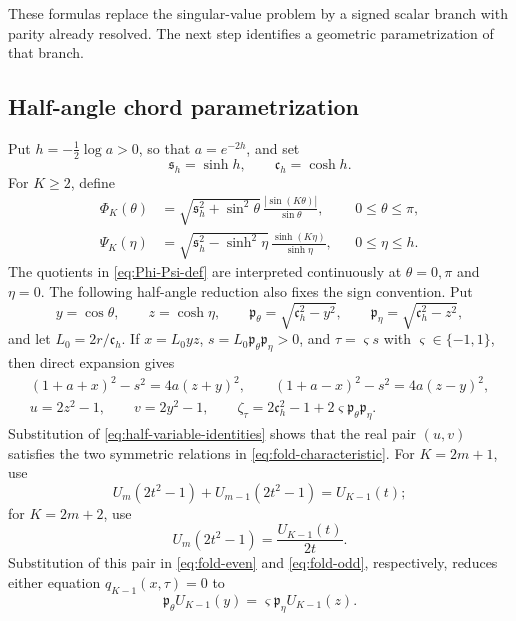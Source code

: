 \documentclass[10pt,twoside]{siamart1116}
\numberwithin{equation}{section}
\begin{document}
These formulas replace the singular-value problem by a signed scalar branch
with parity already resolved.  The next step identifies a geometric
parametrization of that branch.

\subsection{Half-angle chord parametrization}
\label{subsec:half-angle-chords}
Put \(h=-\tfrac12\log a>0\), so that \(a=e^{-2h}\), and set
\[
 \mathfrak s_h=\sinh h,\qquad \mathfrak c_h=\cosh h.
\]
For \(K\geq2\), define
\begin{equation}\label{eq:Phi-Psi-def}
\begin{aligned}
 \Phi_K(\theta)
 &=\sqrt{\mathfrak s_h^2+\sin^2\theta}\,
   \frac{|\sin(K\theta)|}{\sin\theta},
   &&0\leq\theta\leq\pi,\\
 \Psi_K(\eta)
 &=\sqrt{\mathfrak s_h^2-\sinh^2\eta}\,
   \frac{\sinh(K\eta)}{\sinh\eta},
   &&0\leq\eta\leq h.
\end{aligned}
\end{equation}
The quotients in \eqref{eq:Phi-Psi-def} are interpreted continuously at
\(\theta=0,\pi\) and \(\eta=0\).  The following half-angle reduction also
fixes the sign convention.  Put
\[
 y=\cos\theta,\qquad z=\cosh\eta,\qquad
 \mathfrak p_\theta=\sqrt{\mathfrak c_h^2-y^2},\qquad
 \mathfrak p_\eta=\sqrt{\mathfrak c_h^2-z^2},
\]
and let \(L_0=2r/\mathfrak c_h\).  If
\(x=L_0yz\), \(s=L_0\mathfrak p_\theta\mathfrak p_\eta>0\), and
\(\tau=\varsigma s\) with \(\varsigma\in\{-1,1\}\), then direct
expansion gives
\begin{equation}\label{eq:half-variable-identities}
\begin{gathered}
 (1+a+x)^2-s^2=4a(z+y)^2,\qquad
 (1+a-x)^2-s^2=4a(z-y)^2,\\
 u=2z^2-1,\qquad v=2y^2-1,\qquad
 \zeta_\tau=2\mathfrak c_h^2-1
 +2\varsigma\mathfrak p_\theta\mathfrak p_\eta.
\end{gathered}
\end{equation}
Substitution of \eqref{eq:half-variable-identities} shows that the real pair
\((u,v)\) satisfies the two symmetric relations in
\eqref{eq:fold-characteristic}.
For \(K=2m+1\), use
\[
 U_m(2t^2-1)+U_{m-1}(2t^2-1)=U_{K-1}(t);
\]
for \(K=2m+2\), use
\[
 U_m(2t^2-1)=\frac{U_{K-1}(t)}{2t}.
\]
Substitution of this pair in \eqref{eq:fold-even} and
\eqref{eq:fold-odd}, respectively, reduces either equation
\(q_{K-1}(x,\tau)=0\) to
\begin{equation}\label{eq:signed-half-chord}
 \mathfrak p_\theta U_{K-1}(y)
 =\varsigma\mathfrak p_\eta U_{K-1}(z).
\end{equation}
\end{document}
